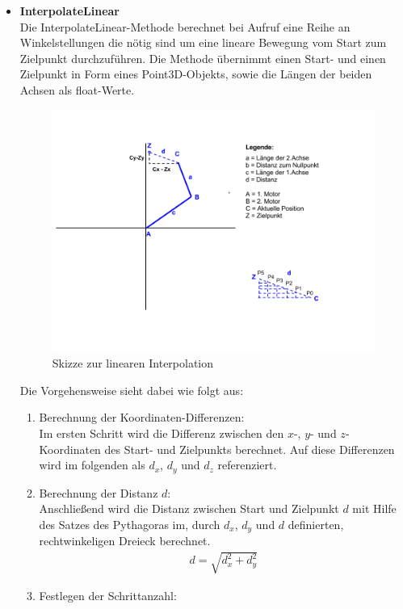 \begin{itemize}
\item \textbf{InterpolateLinear}\\
Die InterpolateLinear-Methode berechnet bei Aufruf eine Reihe an Winkelstellungen die nötig sind um eine lineare Bewegung vom Start zum Zielpunkt durchzuführen. Die Methode übernimmt einen Start- und einen Zielpunkt in Form eines Point3D-Objekts, sowie die Längen der beiden Achsen als float-Werte.\\
\begin{figure}[H]
  \centering
  \begin{minipage}[t]{12 cm}
  	\centering
  	\includegraphics[width=12cm]{images/Linearinterpolation} 
    \caption{Skizze zur linearen Interpolation}
  \end{minipage}
\end{figure}
Die Vorgehensweise sieht dabei wie folgt aus:
\begin{enumerate}
\item Berechnung der Koordinaten-Differenzen:\\
Im ersten Schritt wird die Differenz zwischen den $x$-, $y$- und $z$-Koordinaten des Start- und Zielpunkts berechnet. Auf diese Differenzen wird im folgenden als $d_x$, $d_y$ und $d_z$ referenziert. 
\item Berechnung der Distanz $d$:\\
Anschließend wird die Distanz zwischen Start und Zielpunkt $d$ mit Hilfe des Satzes des Pythagoras im, durch $d_x$, $d_y$ und $d$ definierten, rechtwinkeligen Dreieck berechnet.
\begin{align*}
d = \sqrt{d_x^2+d_y^2}
\end{align*}
\item Festlegen der Schrittanzahl:\\

\end{enumerate}
\end{itemize}
